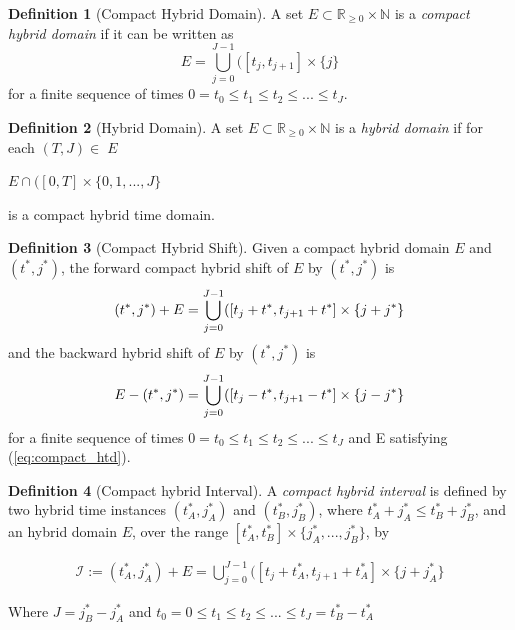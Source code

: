 \documentclass{article}
\theoremstyle{definition}
\newtheorem{definition}{Definition}[section]
\begin{document}
\begin{definition}[Compact Hybrid Domain] A set $E \subset
    \mathbb{R}_{\geq0} \times \mathbb{N}$ is a  \textit{compact hybrid
    domain} if it can be written as
\begin{equation}
    \label{eq:compact_htd}
    E = \bigcup\limits_{j=0}^{J-1} ([t_j,t_{j+1}] \times \{j\}
\end{equation}
for a finite sequence of times $0 = t_0 \leq t_1 \leq t_2 \leq ... \leq t_J$.
\end{definition}

\begin{definition}[Hybrid Domain]
A set $E \subset \mathbb{R}_{\geq0} \times \mathbb{N}$ is a \textit{hybrid  domain} if for each $(T,J)\in\;E$
\begin{center}
    $E \cap ([0,T] \times \{0,1,...,J\}$
\end{center} 
is a compact hybrid time domain.
\end{definition}

\begin{definition}[Compact Hybrid Shift] Given a compact hybrid domain $E$
    and $(t^*,j^*)$, the forward {compact hybrid shift} of $E$ by $(t^*,j^*)$ is
\begin{equation}
    (t^*,j^*) + E = \bigcup\limits_{j=0}^{J-1} ([t_j + t^*,t_{j+1}+t^*] \times \{j+j^*\}\quad\\
\end{equation}
and the backward hybrid shift of $E$ by $(t^*,j^*)$ is
\begin{equation}
    E - (t^*,j^*) = \bigcup\limits_{j=0}^{J-1} ([t_j - t^*,t_{j+1}-t^*] \times \{j-j^*\}\\
\end{equation}
for a finite sequence of times $0 = t_0 \leq t_1 \leq t_2 \leq ... \leq t_J$
and E satisfying (\ref{eq:compact_htd}).
\end{definition}

\begin{definition}[Compact hybrid Interval] A \textit{compact hybrid
    interval} is defined by two hybrid time instances $(t^*_A,j^*_A)$ and
    $(t^*_B,j^*_B)$, where $t^*_A + j^*_A \leq t^*_B + j^*_B$, and an hybrid domain $E$, over the range $[t^*_A,
    t^*_B]\times\{j^*_A,..., j^*_B\}$, by

\begin{gather}
    \mathcal{I} := (t^*_A,j^*_A) + E = \bigcup\limits_{j=0}^{J-1} ([t_j + t^*_A,t_{j+1} + t^*_A] \times \{j + j^*_A\}
\end{gather}

Where $J = j^*_B - j^*_A$ and $t_0 = 0 \leq t_1 \leq t_2 \leq ... \leq t_J = t^*_B - t^*_A$
\end{definition}
\end{document}
